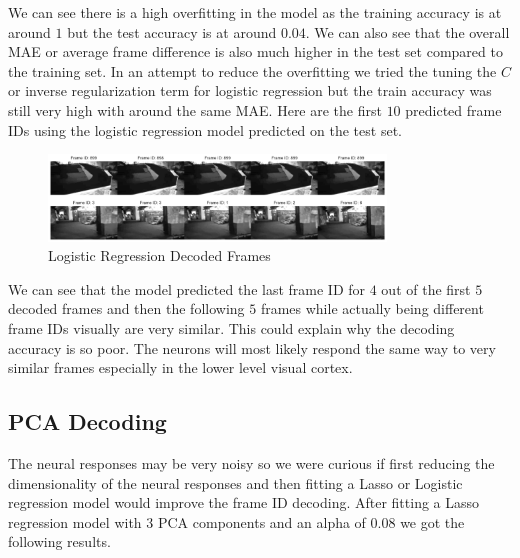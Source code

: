 \documentclass[12pt, letterpaper]{article}
\begin{document}
We can see there is a high overfitting in the model as the training accuracy is at around $1$ but the test accuracy is at around $0.04$. We can also see that the overall MAE or average frame difference is also much higher in the test set compared to the training set. In an attempt to reduce the overfitting we tried the tuning the $C$ or inverse regularization term for logistic regression but the train accuracy was still very high with around the same MAE. Here are the first $10$ predicted frame IDs using the logistic regression model predicted on the test set.

\begin{figure}[H]
    \centering
    \includegraphics[width=0.8\textwidth]{neuropixel_logistic_reg_video.png}
    \caption{Logistic Regression Decoded Frames}
    \label{fig:neuropixel_logistic_frame_id_decoded}
\end{figure}

We can see that the model predicted the last frame ID for $4$ out of the first $5$ decoded frames and then the following $5$ frames while actually being different frame IDs visually are very similar. This could explain why the decoding accuracy is so poor. The neurons will most likely respond the same way to very similar frames especially in the lower level visual cortex.

\subsection{PCA Decoding}
\label{subsec:pca_decoding}
The neural responses may be very noisy so we were curious if first reducing the dimensionality of the neural responses and then fitting a Lasso or Logistic regression model would improve the frame ID decoding. After fitting a Lasso regression model with $3$ PCA components and an alpha of $0.08$ we got the following results.
\end{document}
